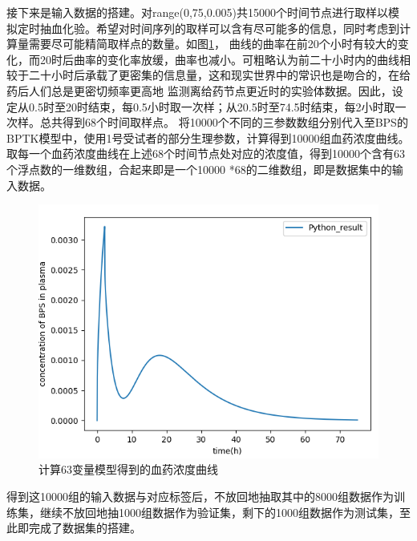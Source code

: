 \documentclass{article}
\begin{document}
接下来是输入数据的搭建。对range(0,75,0.005)共15000个时间节点进行取样以模拟定时抽血化验。希望对时间序列的取样可以含有尽可能多的信息，同时考虑到计算量需要尽可能精简取样点的数量。如图\ref{fig6}，
曲线的曲率在前20个小时有较大的变化，而20时后曲率的变化率放缓，曲率也减小。可粗略认为前二十小时内的曲线相较于二十小时后承载了更密集的信息量，这和现实世界中的常识也是吻合的，在给药后人们总是更密切频率更高地
监测离给药节点更近时的实验体数据。因此，设定从0.5时至20时结束，每0.5小时取一次样；从20.5时至74.5时结束，每2小时取一次样。总共得到68个时间取样点。
将10000个不同的三参数数组分别代入至BPS的BPTK模型中，使用1号受试者的部分生理参数，计算得到10000组血药浓度曲线。取每一个血药浓度曲线在上述68个时间节点处对应的浓度值，得到10000个含有63个浮点数的一维数组，合起来即是一个10000
*68的二维数组，即是数据集中的输入数据。
\begin{figure}[H]
  \centering
  \includegraphics[scale=0.5]{pic6.png}
  \caption{计算63变量模型得到的血药浓度曲线}
  \label{fig6}
\end{figure}


得到这10000组的输入数据与对应标签后，不放回地抽取其中的8000组数据作为训练集，继续不放回地抽1000组数据作为验证集，剩下的1000组数据作为测试集，至此即完成了数据集的搭建。
\end{document}
